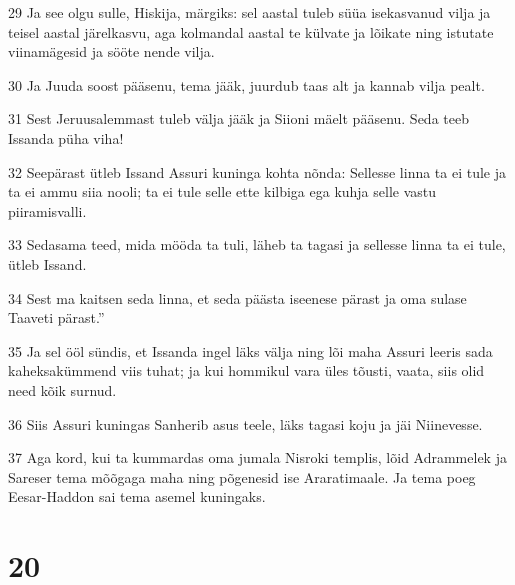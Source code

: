 \par 29 Ja see olgu sulle, Hiskija, märgiks: sel aastal tuleb süüa isekasvanud vilja ja teisel aastal järelkasvu, aga kolmandal aastal te külvate ja lõikate ning istutate viinamägesid ja sööte nende vilja.
\par 30 Ja Juuda soost pääsenu, tema jääk, juurdub taas alt ja kannab vilja pealt.
\par 31 Sest Jeruusalemmast tuleb välja jääk ja Siioni mäelt pääsenu. Seda teeb Issanda püha viha!
\par 32 Seepärast ütleb Issand Assuri kuninga kohta nõnda: Sellesse linna ta ei tule ja ta ei ammu siia nooli; ta ei tule selle ette kilbiga ega kuhja selle vastu piiramisvalli.
\par 33 Sedasama teed, mida mööda ta tuli, läheb ta tagasi ja sellesse linna ta ei tule, ütleb Issand.
\par 34 Sest ma kaitsen seda linna, et seda päästa iseenese pärast ja oma sulase Taaveti pärast.”
\par 35 Ja sel ööl sündis, et Issanda ingel läks välja ning lõi maha Assuri leeris sada kaheksakümmend viis tuhat; ja kui hommikul vara üles tõusti, vaata, siis olid need kõik surnud.
\par 36 Siis Assuri kuningas Sanherib asus teele, läks tagasi koju ja jäi Niinevesse.
\par 37 Aga kord, kui ta kummardas oma jumala Nisroki templis, lõid Adrammelek ja Sareser tema mõõgaga maha ning põgenesid ise Araratimaale. Ja tema poeg Eesar-Haddon sai tema asemel kuningaks.

\chapter{20}


